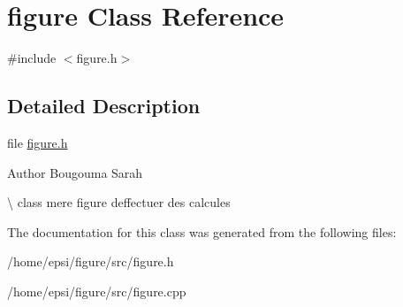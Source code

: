 \hypertarget{classfigure}{}\section{figure Class Reference}
\label{classfigure}


{\ttfamily \#include $<$figure.\+h$>$}



\subsection{Detailed Description}
file \hyperlink{figure_8h_source}{figure.\+h} \begin{DoxyAuthor}{Author}
Bougouma Sarah
\end{DoxyAuthor}
\textbackslash{} class mere figure  d\textquotesingle{}effectuer des calcules 

The documentation for this class was generated from the following files\+:\begin{DoxyCompactItemize}
\item 
/home/epsi/figure/src/figure.\+h\item 
/home/epsi/figure/src/figure.\+cpp\end{DoxyCompactItemize}
